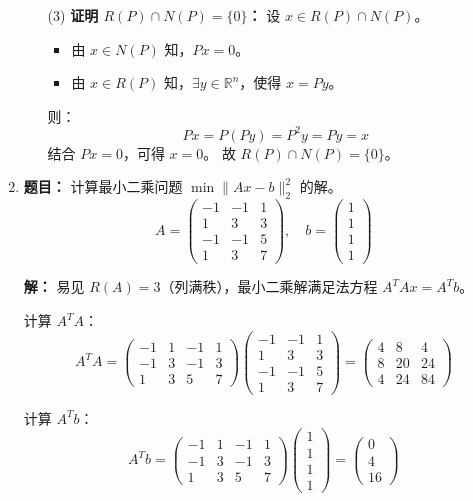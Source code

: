 \documentclass[12pt, a4paper]{article}
\newcommand{\R}{\mathbb{R}}
\begin{document}
\begin{enumerate}
\begin{enumerate}
			\item[(3)] \textbf{证明 $R(P) \cap N(P) = \{0\}$：}
			设 $x \in R(P) \cap N(P)$。
			\begin{itemize}
				\item 由 $x \in N(P)$ 知，$Px = 0$。
				\item 由 $x \in R(P)$ 知，$\exists y \in \R^n$，使得 $x = Py$。
			\end{itemize}
			则：
			\[
			Px = P(Py) = P^2y = Py = x
			\]
			结合 $Px=0$，可得 $x = 0$。
			故 $R(P) \cap N(P) = \{0\}$。
		\end{enumerate}
		
		\item \textbf{题目：} 计算最小二乘问题 $\min \|Ax - b\|_2^2$ 的解。
		\[
		A = \begin{pmatrix} -1 & -1 & 1 \\ 1 & 3 & 3 \\ -1 & -1 & 5 \\ 1 & 3 & 7 \end{pmatrix}, \quad 
		b = \begin{pmatrix} 1 \\ 1 \\ 1 \\ 1 \end{pmatrix}
		\]
		
		\textbf{解：} 
		易见 $R(A)=3$（列满秩），最小二乘解满足法方程 $A^T A x = A^T b$。
		
		计算 $A^T A$：
		\[
		A^T A = \begin{pmatrix} -1 & 1 & -1 & 1 \\ -1 & 3 & -1 & 3 \\ 1 & 3 & 5 & 7 \end{pmatrix}
		\begin{pmatrix} -1 & -1 & 1 \\ 1 & 3 & 3 \\ -1 & -1 & 5 \\ 1 & 3 & 7 \end{pmatrix}
		= \begin{pmatrix} 4 & 8 & 4 \\ 8 & 20 & 24 \\ 4 & 24 & 84 \end{pmatrix}
		\]
		
		计算 $A^T b$：
		\[
		A^T b = \begin{pmatrix} -1 & 1 & -1 & 1 \\ -1 & 3 & -1 & 3 \\ 1 & 3 & 5 & 7 \end{pmatrix}
		\begin{pmatrix} 1 \\ 1 \\ 1 \\ 1 \end{pmatrix}
		= \begin{pmatrix} 0 \\ 4 \\ 16 \end{pmatrix}
		\]
		

\end{enumerate}
\end{document}
